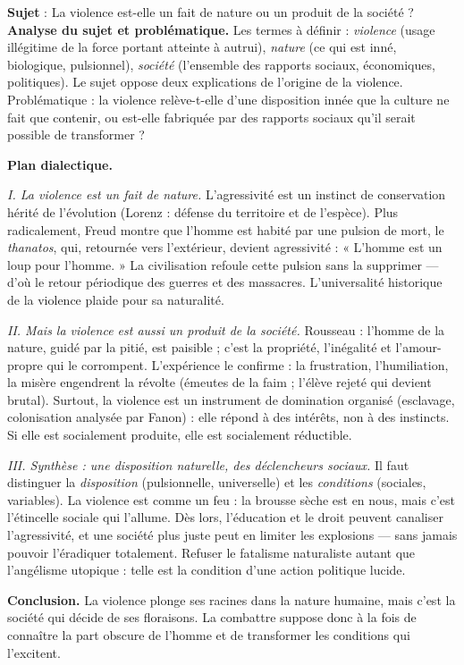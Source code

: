 \documentclass[11pt]{article}
\begin{document}
\begin{exoresolu}
\textbf{Sujet} : La violence est-elle un fait de nature ou un produit de la société ?
\tcblower
\textbf{Analyse du sujet et problématique.} Les termes à définir : \emph{violence} (usage illégitime de la force portant atteinte à autrui), \emph{nature} (ce qui est inné, biologique, pulsionnel), \emph{société} (l'ensemble des rapports sociaux, économiques, politiques). Le sujet oppose deux explications de l'origine de la violence. Problématique : la violence relève-t-elle d'une disposition innée que la culture ne fait que contenir, ou est-elle fabriquée par des rapports sociaux qu'il serait possible de transformer ?

\textbf{Plan dialectique.}

\emph{I. La violence est un fait de nature.} L'agressivité est un instinct de conservation hérité de l'évolution (Lorenz : défense du territoire et de l'espèce). Plus radicalement, Freud montre que l'homme est habité par une pulsion de mort, le \emph{thanatos}, qui, retournée vers l'extérieur, devient agressivité : « L'homme est un loup pour l'homme. » La civilisation refoule cette pulsion sans la supprimer — d'où le retour périodique des guerres et des massacres. L'universalité historique de la violence plaide pour sa naturalité.

\emph{II. Mais la violence est aussi un produit de la société.} Rousseau : l'homme de la nature, guidé par la pitié, est paisible ; c'est la propriété, l'inégalité et l'amour-propre qui le corrompent. L'expérience le confirme : la frustration, l'humiliation, la misère engendrent la révolte (émeutes de la faim ; l'élève rejeté qui devient brutal). Surtout, la violence est un instrument de domination organisé (esclavage, colonisation analysée par Fanon) : elle répond à des intérêts, non à des instincts. Si elle est socialement produite, elle est socialement réductible.

\emph{III. Synthèse : une disposition naturelle, des déclencheurs sociaux.} Il faut distinguer la \emph{disposition} (pulsionnelle, universelle) et les \emph{conditions} (sociales, variables). La violence est comme un feu : la brousse sèche est en nous, mais c'est l'étincelle sociale qui l'allume. Dès lors, l'éducation et le droit peuvent canaliser l'agressivité, et une société plus juste peut en limiter les explosions — sans jamais pouvoir l'éradiquer totalement. Refuser le fatalisme naturaliste autant que l'angélisme utopique : telle est la condition d'une action politique lucide.

\textbf{Conclusion.} La violence plonge ses racines dans la nature humaine, mais c'est la société qui décide de ses floraisons. La combattre suppose donc à la fois de connaître la part obscure de l'homme et de transformer les conditions qui l'excitent.
\end{exoresolu}
\end{document}
